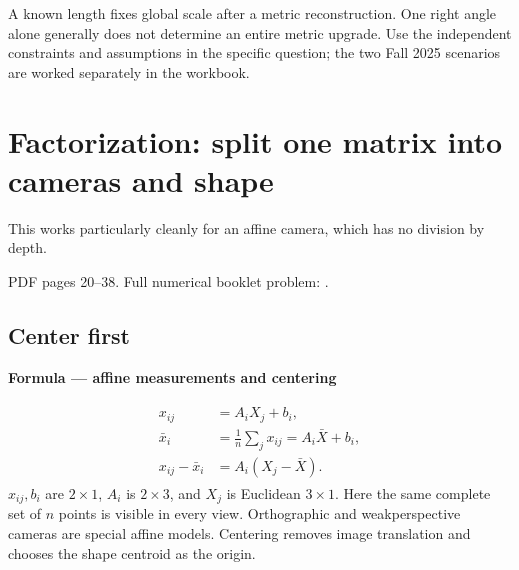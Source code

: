 \documentclass[letterpaper,11pt,english,openany,oneside]{jupyterBook}
\begin{document}
\sphinxAtStartPar
A known length fixes global scale after a metric reconstruction. One right angle alone generally does not determine an entire metric upgrade. Use the independent constraints and assumptions in the specific question; the two Fall 2025 scenarios are worked separately in the workbook.

\ignorespaces
{}\ignorespaces
\sphinxstepscope


\section{Factorization: split one matrix into cameras and shape}
\label{\detokenize{lectures/lecture06/factorization:factorization-split-one-matrix-into-cameras-and-shape}}\label{\detokenize{lectures/lecture06/factorization:lec06-factorization}}\label{\detokenize{lectures/lecture06/factorization::doc}}
\sphinxAtStartPar
{} This works particularly cleanly for an affine camera, which has no division by depth.

\sphinxAtStartPar
{} PDF pages 20–38. Full numerical booklet problem: {\hyperref[\detokenize{lectures/lecture06/quiz-workbook:quiz-a7-q1}]{}}.


\subsection{Center first}
\label{\detokenize{lectures/lecture06/factorization:center-first}}
\begin{TextbookBox}
\textbf{Formula — affine measurements and centering}\par\smallskip
\begin{equation}\label{equation:lectures/lecture06/factorization:eq-lec06-affine}
\begin{split}\begin{aligned}
x_{ij}&=A_iX_j+b_i,\\
\bar x_i&=\frac1n\sum_jx_{ij}=A_i\bar X+b_i,\\
x_{ij}-\bar x_i&=A_i(X_j-\bar X).
\end{aligned}\end{split}
\end{equation}
\sphinxAtStartPar
\(x_{ij},b_i\) are \(2\times1\), \(A_i\) is \(2\times3\), and \(X_j\) is Euclidean \(3\times1\). Here the same complete set of \(n\) points is visible in every view. Orthographic and weak\sphinxhyphen{}perspective cameras are special affine models. Centering removes image translation and chooses the shape centroid as the origin.

\end{TextbookBox}
\end{document}
